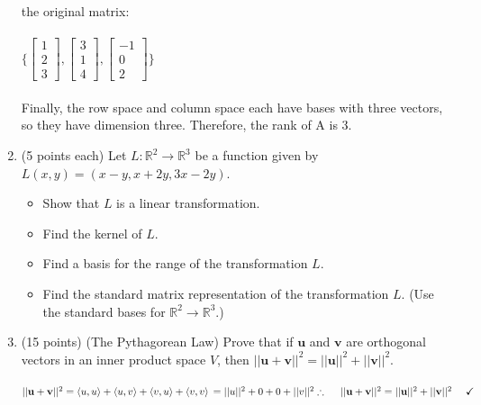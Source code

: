 \documentclass[fleqn]{article}
\begin{document}
\begin{enumerate}
{        the original matrix:
        \\
        \\
        $
          \{ 
            \begin{bmatrix}
              1
              \\
              2
              \\
              3
            \end{bmatrix},
            \begin{bmatrix}
              3
              \\
              1
              \\
              4
            \end{bmatrix},
            \begin{bmatrix}
              -1
              \\
              0
              \\
              2
            \end{bmatrix}
          \} 
        $
        \\
        \\
        Finally, the row space and column space each have bases with three vectors, so they have
        dimension three. Therefore, the rank of A is 3.
      }


    \item (5 points each) Let $L: \mathbb{R}^2 \rightarrow \mathbb{R}^3$ be a function given by $L(x,y)=(x-y, x+2y, 3x-2y)$.
      \begin{itemize}
        \item Show that $L$ is a linear transformation.
        \item Find the kernel of $L$.
        \item Find a basis for the range of the transformation $L$.
        \item Find the standard matrix representation of the transformation $L$. (Use the standard bases for $\mathbb{R}^2 \rightarrow \mathbb{R}^3$.)
      \end{itemize}


    \item (15 points) (The Pythagorean Law) Prove that if $\mathbf{u}$ and $\mathbf{v}$ are orthogonal vectors in an inner
    product space $V$, then $||\mathbf{u}+\mathbf{v}||^2=||\mathbf{u}||^2+||\mathbf{v}||^2$.

      \textcolor{hwColor}{
        $
          ||\mathbf{u}+\mathbf{v}||^2=
          \left\langle u, u\right\rangle
          +\left\langle u, v \right\rangle
          +\left\langle v, u\right\rangle
          +\left\langle v, v\right\rangle
          \\
          \\
          \\
          =||u||^2+0+0+||v||^2 
          \\
          \\
          \\
          \therefore ~~~~ ||\mathbf{u}+\mathbf{v}||^2=||\mathbf{u}||^2+||\mathbf{v}||^2 ~~~~ \checkmark
        $
      }


\end{enumerate}
\end{document}
